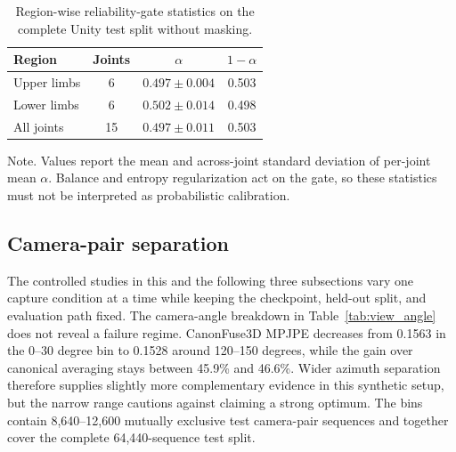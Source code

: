 \documentclass[preprint,12pt]{elsarticle}
\renewcommand{\textit}[1]{\textup{#1}}
\begin{document}
\begin{table}[t]
\centering
\caption{Region-wise reliability-gate statistics on the complete Unity test split without masking.}
\label{tab:gate_region_summary}
\footnotesize
\setlength{\tabcolsep}{6pt}
\renewcommand{\arraystretch}{1.08}
\begin{tabular}{lccc}
\toprule
Region & Joints & \(\alpha\) & \(1-\alpha\) \\
\midrule
Upper limbs & 6 & \(0.497 \pm 0.004\) & 0.503 \\
Lower limbs & 6 & \(0.502 \pm 0.014\) & 0.498 \\
All joints & 15 & \(0.497 \pm 0.011\) & 0.503 \\
\bottomrule
\end{tabular}
\vspace{0.4em}
\begin{minipage}{0.94\linewidth}
\footnotesize
\textit{Note.} Values report the mean and across-joint standard deviation of per-joint mean \(\alpha\). Balance and entropy regularization act on the gate, so these statistics must not be interpreted as probabilistic calibration.
\end{minipage}
\end{table}

\FloatBarrier
\subsection{Camera-pair separation}

The controlled studies in this and the following three subsections vary one capture condition at a time while keeping the checkpoint, held-out split, and evaluation path fixed. The camera-angle breakdown in Table~\ref{tab:view_angle} does not reveal a failure regime. CanonFuse3D MPJPE decreases from 0.1563 in the 0--30 degree bin to 0.1528 around 120--150 degrees, while the gain over canonical averaging stays between 45.9\% and 46.6\%. Wider azimuth separation therefore supplies slightly more complementary evidence in this synthetic setup, but the narrow range cautions against claiming a strong optimum. The bins contain 8,640--12,600 mutually exclusive test camera-pair sequences and together cover the complete 64,440-sequence test split.
\end{document}
